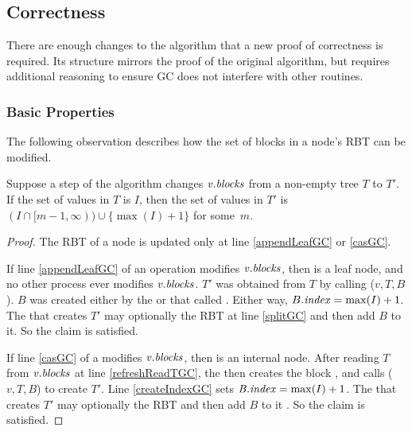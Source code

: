 
\subsection{Correctness}
There are enough changes to the algorithm that a new proof of correctness
is required.  Its structure mirrors the proof of the original algorithm, but requires additional
reasoning to ensure GC does not interfere with other routines.

\subsubsection{Basic Properties}

The following observation describes
how the set of blocks in a node's RBT can be modified.

\begin{lemma}\label{RBTupdates}
Suppose a step of the algorithm changes $\mbox{\textnormal{\textit{v}}}.\mbox{\textit{blocks}}$ from a non-empty tree $T$ to $T'$.
If the set of  values  in $T$ is $I$, then the set of  values in $T'$ is 
$(I \cap [m-1,\infty))\cup \{\max(I) + 1\}$ for some~$m$.
\end{lemma}
\begin{proof}
The RBT of a node is updated only at line \ref{appendLeafGC} or \ref{casGC}.

If line \ref{appendLeafGC} of an  operation modifies $\mbox{\textnormal{\textit{v}}}.\mbox{\textit{blocks}}$,
then  is a leaf node, and no other process ever modifies $\mbox{\textnormal{\textit{v}}}.\mbox{\textit{blocks}}$.
$T'$ was obtained from $T$ by calling ($v,T,B$).
$B$ was created either by the  or  that called .
Either way, $B.\mbox{\textit{index}} = \max(I)+1$.
The  that creates $T'$ may optionally  the RBT at line \ref{splitGC} and then add $B$ to it.
So the claim is satisfied.

If line \ref{casGC} of a  modifies $\mbox{\textnormal{\textit{v}}}.\mbox{\textit{blocks}}$, then  is an internal node.
After reading $T$ from $\mbox{\textnormal{\textit{v}}}.\mbox{\textit{blocks}}$ at line \ref{refreshReadTGC},
the  then creates the block ,
and calls ($v,T,B$) to create $T'$.
Line \ref{createIndexGC} sets $\mbox{\textnormal{\textit{B}}}.\mbox{\textnormal{\textit{index}}} = \max(I)+1$.
The  that creates $T'$ may optionally  the RBT 
and then add $B$ to it .
So the claim is satisfied.
\end{proof}

